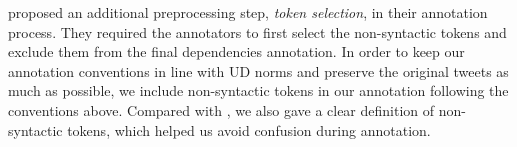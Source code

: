 \documentclass[11pt,a4paper]{article}
\newcommand{\nascomment}[1]{\textcolor{blue}{[#1 ---\textsc{nas}]}}
\newcommand{\yicomment}[1]{\textcolor{gray}{[#1 ---\textsc{yi}]}}
\begin{document}
 proposed an additional
preprocessing step, \emph{token selection}, in their annotation process.
They required the annotators to first select the non-syntactic
tokens and exclude them from the final dependencies annotation.
In order to keep our annotation conventions in line with UD norms and preserve the original tweets as much as possible,
we include non-syntactic tokens in our annotation following the
conventions above. Compared with \citet{kong-EtAl:2014:EMNLP2014},
we also gave a clear %
definition of non-syntactic tokens, which helped
us avoid confusion during annotation.

\end{document}
